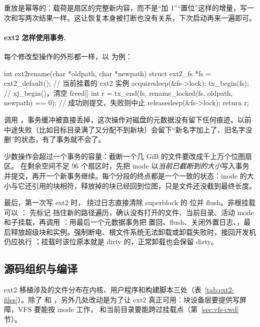 重放是幂等的：载荷是扇区的完整新内容，而不是“加 1”“置位”这样的增量，写一次和写两次结果一样。这让恢复本身被打断也没有关系，下次启动再来一遍即可。

\paragraph{ext2 怎样使用事务.} 每个修改型操作的外形都一样，以  为例：

\begin{ccode}
int ext2rename(char *oldpath, char *newpath) {
  struct ext2_fs *fs = ext2_default();                      // 当前挂着的 ext2 实例
  acquiresleep(&fs->lock);
  tx_begin(fs);                                             // xj_begin()，清空 freed[]
  int r = tx_end(fs, rename_locked(fs, oldpath, newpath) == 0);  // 成功则提交，失败则中止
  releasesleep(&fs->lock);
  return r;
}
\end{ccode}

 调用 ，事务缓冲被直接丢掉，这次操作对磁盘的元数据没有留下任何痕迹。以前  中途失败（比如目标目录满了又分配不到新块）会留下“新名字加上了、旧名字没删”的状态，有了事务就不会了。

少数操作会超过一个事务的容量：截断一个几 GiB 的文件要改成千上万个位图扇区。 在剩余空间不足 96 个扇区时，先把 inode 以\emph{当前已截断到的大小}写入事务并提交，再开一个新事务继续。每个分段的终点都是一个一致的状态：inode 的大小与它还引用的块相符，释放掉的块已经回到位图，只是文件还没截到最终长度。

最后，第一次写 ext2 时， 绕过日志直接清除 superblock 的  位并 flush。非根挂载可以 ： 先标记  挡住新的路径遍历，确认没有打开的文件、当前目录、活动 inode 和子挂载，再调用 ：用最后一个元数据事务把  置回、flush、关闭外置日志、，最后释放超级块和实例。强制断电、根文件系统无法卸载或卸载失败时，接回开发机仍应执行 ；挂载时该位原本就是 dirty 的，正常卸载也会保留 dirty。

\subsection{源码组织与编译}
\label{sec:ext2-build}

ext2 移植涉及的文件分布在内核、用户程序和构建脚本三处（表~\ref{tab:ext2-files}）。除了  和 ，另外几处改动是为了让 ext2 真正可用：块设备层要提供写屏障，VFS 要能按 inode 工作， 和当前目录要能跨过挂载点（第~\ref{sec:vfs-cwd} 节）。

